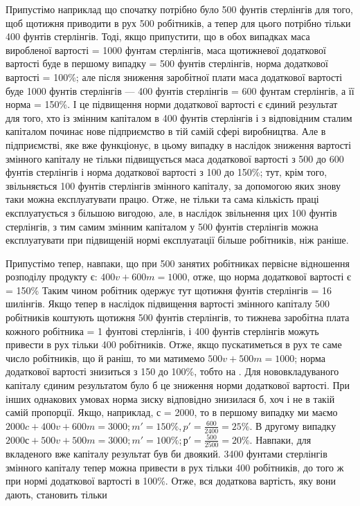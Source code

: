 
Припустімо наприклад що спочатку потрібно було 500 фунтів
стерлінгів для того, щоб щотижня приводити в рух 500 робітників, а тепер для цього потрібно тільки
400 фунтів стерлінгів.
Тоді, якщо припустити, що в обох випадках маса виробленої
вартості = 1000 фунтам стерлінгів, маса щотижневої додаткової вартості буде в першому випадку = 500
фунтів стерлінгів, норма додаткової вартості  = 100\%; але після зниження заробітної плати
маса додаткової вартості буде 1000 фунтів стерлінгів — 400 фунтів стерлінгів = 600 фунтам
стерлінгів, а її норма  = 150\%. І це підвищення норми додаткової вартості є єдиний результат
для того, хто із змінним капіталом в 400 фунтів стерлінгів і з відповідним сталим капіталом починає
нове підприємство в тій самій сфері виробництва. Але в підприємстві, яке вже функціонує, в цьому
випадку в наслідок зниження вартості змінного
капіталу не тільки підвищується маса додаткової вартості з 500
до 600 фунтів стерлінгів і норма додаткової вартості з 100
до 150\%; тут, крім того, звільняється 100 фунтів стерлінгів
змінного капіталу, за допомогою яких знову таки можна експлуатувати працю. Отже, не тільки та сама
кількість праці експлуатується з більшою вигодою, але, в наслідок звільнення цих 100 фунтів
стерлінгів, з тим самим змінним капіталом у 500 фунтів стерлінгів можна експлуатувати при підвищеній
нормі експлуатації більше робітників, ніж раніше.

Припустімо тепер, навпаки, що при 500 занятих робітниках
первісне відношення розподілу продукту є: $400 v + 600 m = 1000$, отже, що норма додаткової вартості є
= 150\% Таким
чином робітник одержує тут щотижня  фунтів стерлінгів = 16 шилінгів. Якщо тепер в наслідок
підвищення вартості
змінного капіталу 500 робітників коштують щотижня 500 фунтів
стерлінгів, то тижнева заробітна плата кожного робітника = 1 фунтові стерлінгів, і 400 фунтів
стерлінгів можуть привести
в рух тільки 400 робітників. Отже, якщо пускатиметься в рух те
саме число робітників, що й раніш, то ми матимемо $500 v + 500 m = 1000$; норма додаткової вартості
знизиться з 150 до 100\%,
тобто на . Для нововкладуваного капіталу єдиним результатом було б це зниження норми додаткової
вартості. При інших
однакових умовах норма зиску відповідно знизилася б, хоч і не
в такій самій пропорції. Якщо, наприклад, с = 2000, то в
першому випадку ми маємо $2000 c + 400 v + 600 m = 3000; m' = 150\%, p' = \frac{600}{2400} = 25\%$. В другому
випадку $2000 с + 500 v + 500 m = 3000; m' = 100\%; р' = \frac{500}{2500} = 20\%$. Навпаки, для вкладеного вже
капіталу результат був би двоякий. 3400 фунтами
стерлінгів змінного капіталу тепер можна привести в рух тільки
400 робітників, до того ж при нормі додаткової вартості в 100\%.
Отже, вся додаткова вартість, яку вони дають, становить тільки
\parbreak{}  %
